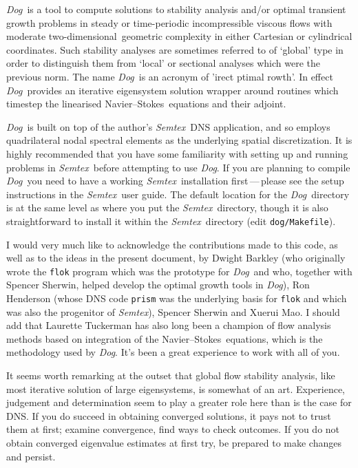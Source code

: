 \documentclass[11pt,a4paper]{report}
\newcommand\NavSto{Navier--Stokes}
\newcommand\twod{two-di\-men\-sion\-al}
\newcommand{\Semtex}{\emph{Semtex}}
\newcommand{\Dog}{\emph{Dog}}
\newcommand\undertext[1]{\underline{\smash{\hbox{#1}}}}
\begin{document}
\Dog\ is a tool to compute solutions to stability analysis and/or
optimal transient growth problems in steady or time-periodic
incompressible viscous flows with moderate \twod\ geometric complexity
in either Cartesian or cylindrical coordinates.  Such stability
analyses are sometimes referred to of `global' type in order to
distinguish them from `local' or sectional analyses which were the
previous norm.  The name \Dog\ is an acronym of '\undertext{d}irect
\undertext{o}ptimal \undertext{g}rowth'.
%
In effect \Dog\ provides an iterative eigensystem solution wrapper
around routines which timestep the linearised \NavSto\ equations and
their adjoint.

\Dog\ is built on top of the author's \Semtex\ DNS application, and so
employs quadrilateral nodal spectral elements as the underlying
spatial discretization. It is highly recommended that you have some
familiarity with setting up and running problems in \Semtex\ before
attempting to use \Dog. If you are planning to compile \Dog\ you need
to have a working \Semtex\ installation first\,---\,please see the
setup instructions in the \Semtex\ user guide.  The default location
for the \Dog\ directory is at the same level as where you put the
\Semtex\ directory, though it is also straightforward to install it
within the \Semtex\ directory (edit \verb+dog/Makefile+).

I would very much like to acknowledge the contributions made to this
code, as well as to the ideas in the present document, by Dwight
Barkley (who originally wrote the \texttt{flok} program which was the
prototype for \Dog\ and who, together with Spencer Sherwin, helped
develop the optimal growth tools in \Dog), Ron Henderson (whose DNS
code \texttt{prism} was the underlying basis for \texttt{flok} and
which was also the progenitor of \Semtex), Spencer Sherwin and Xuerui
Mao. I should add that Laurette Tuckerman has also long been a
champion of flow analysis methods based on integration of the
\NavSto\ equations, which is the methodology used by \Dog.  It's been
a great experience to work with all of you.

It seems worth remarking at the outset that global flow stability
analysis, like most iterative solution of large eigensystems, is
somewhat of an art.  Experience, judgement and determination seem to
play a greater role here than is the case for DNS.  If you do succeed
in obtaining converged solutions, it pays not to trust them at first;
examine convergence, find ways to check outcomes.  If you do not
obtain converged eigenvalue estimates at first try, be prepared to
make changes and persist. 
\end{document}
